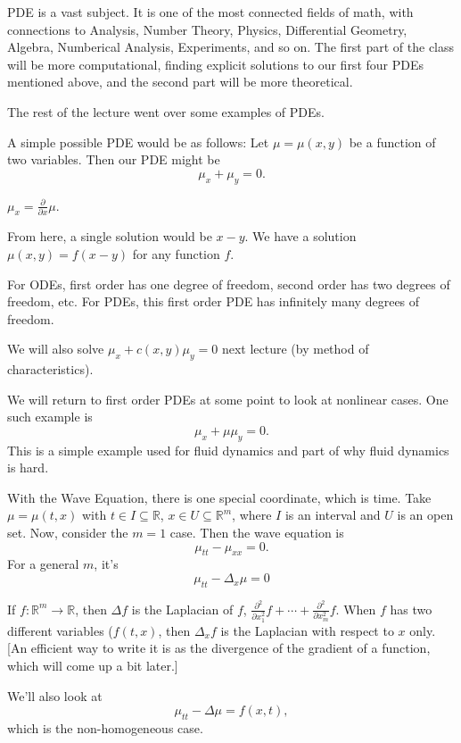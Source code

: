 PDE is a vast subject. It is one of the most connected fields of math, with connections to Analysis, Number Theory, Physics, Differential Geometry, Algebra, Numberical Analysis, Experiments, and so on. The first part of the class will be more computational, finding explicit solutions to our first four PDEs mentioned above, and the second part will be more theoretical.\pagebreak

The rest of the lecture went over some examples of PDEs.
\begin{example}
	A simple possible PDE would be as follows: Let \( \mu = \mu(x, y) \) be a function of two variables. Then our PDE might be \[ \mu_{x} + \mu_{y} = 0. \]
		\begin{remark}
			\( \mu_{x} = \frac{\partial}{\partial x} \mu \).
		\end{remark}
		From here, a single solution would be \( x - y \). We have a solution \( \mu(x, y) = f(x - y) \) for any function \( f \).
		\begin{remark}
		For ODEs, first order has one degree of freedom, second order has two degrees of freedom, etc. For PDEs, this first order PDE has infinitely many degrees of freedom.
		\end{remark}
		We will also solve \( \mu_{x} + c(x, y) \mu_{y} = 0 \) next lecture (by method of characteristics).
\end{example}

\begin{example}
	We will return to first order PDEs at some point to look at nonlinear cases. One such example is 
	\[ \mu_{x} + \mu \mu_{y} = 0. \]
	This is a simple example used for fluid dynamics and part of why fluid dynamics is hard.
\end{example}
\begin{example}
		With the Wave Equation, there is one special coordinate, which is time.
		Take \( \mu = \mu(t, x) \) with \( t \in I \subseteq \mathbb{R} \), \( x \in U \subseteq \mathbb{R}^{m} \), where \( I \) is an interval and \( U \) is an open set. Now, consider the \( m = 1 \) case. Then the wave equation is
		\[ \mu_{tt} - \mu_{x x} = 0. \]
		For a general \( m \), it's
		\[ \mu_{tt} - \Delta_{x} \mu = 0  \]
		\begin{remark}
			If \( f : \mathbb{R}^{m} \to \mathbb{R} \), then \( \Delta f \) is the Laplacian of \( f \), \( \frac{\partial^{2}}{\partial x_{1}^{2}} f + \cdots + \frac{\partial^{2}}{\partial x_{m}^{2}} f \). When \( f \) has two different variables (\( f(t, x) \), then \( \Delta_{x} f \) is the Laplacian with respect to \( x \) only. [An efficient way to write it is as the divergence of the gradient of a function, which will come up a bit later.]
		\end{remark}
		We'll also look at
		\[ \mu_{tt} - \Delta \mu = f(x, t), \]
		which is the non-homogeneous case.
\end{example}


